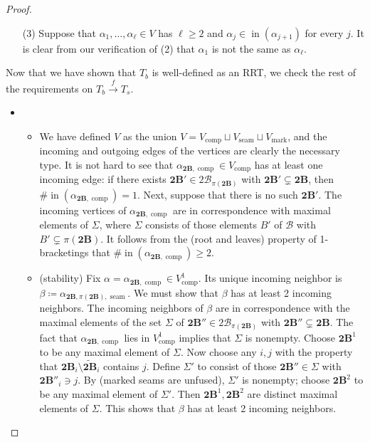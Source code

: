 \documentclass[11pt]{amsart}
\theoremstyle{definition}
\theoremstyle{remark}
\theoremstyle{plain}
\newcommand{\btB}{{\mathbf{2B}}}
\newcommand{\sB}{\mathscr{B}}
\newcommand{\stB}{2\mathscr{B}}
\newcommand{\on}{\operatorname}
\newcommand{\comp}{C^2}
\renewcommand{\comp}{{\on{comp}}}
\newcommand{\seam}{{\on{seam}}}
\newcommand{\mk}{{\on{mark}}}
\newcommand{\incom}{\on{in}}
\newcommand{\sr}{\stackrel}
\newcommand{\wt}{\widetilde}
\begin{document}
\begin{proof}
\begin{itemize}
\item[(3)] Suppose that $\alpha_1, \ldots, \alpha_\ell \in V$ has $\ell \geq 2$ and $\alpha_j \in \incom(\alpha_{j+1})$ for every $j$.
It is clear from our verification of (2) that $\alpha_1$ is not the same as $\alpha_\ell$.
\end{itemize}
Now that we have shown that $T_b$ is well-defined as an RRT, we check the rest of the requirements on $T_b \sr{f}{\to} T_s$.
\begin{itemize}
\item
\begin{itemize}
\item We have defined $V$ as the union $V = V_\comp \sqcup V_\seam \sqcup V_\mk$, and the incoming and outgoing edges of the vertices are clearly the necessary type.
It is not hard to see that $\alpha_{\btB,\comp} \in V_\comp$ has at least one incoming edge: if there exists $\btB' \in \stB_{\pi(\btB)}$ with $\btB' \subsetneq \btB$, then $\#\!\incom(\alpha_{\btB,\comp}) = 1$.
Next, suppose that there is no such $\btB'$.
The incoming vertices of $\alpha_{\btB,\comp}$ are in correspondence with maximal elements of $\Sigma$, where $\Sigma$ consists of those elements $B'$ of $\sB$ with $B' \subsetneq \pi(\btB)$.
It follows from the {\sc (root and leaves)} property of 1-bracketings that $\#\!\incom(\alpha_{\btB,\comp}) \geq 2$.

\item {\sc(stability)} Fix $\alpha = \alpha_{\btB,\comp} \in V_\comp^1$.
Its unique incoming neighbor is $\beta\coloneqq \alpha_{\btB,\pi(\btB),\seam}$.
We must show that $\beta$ has at least 2 incoming neighbors.
The incoming neighbors of $\beta$ are in correspondence with the maximal elements of the set $\Sigma$ of $\btB'' \in \stB_{\pi(\btB)}$ with $\btB'' \subsetneq \btB$.
The fact that $\alpha_{\btB,\comp}$ lies in $V_\comp^1$ implies that $\Sigma$ is nonempty.
Choose $\btB^1$ to be any maximal element of $\Sigma$.
Now choose any $i, j$ with the property that $\btB_i \setminus \wt\btB_i$ contains $j$.
Define $\Sigma'$ to consist of those $\btB'' \in \Sigma$ with $\btB''_i \ni j$.
By {\sc(marked seams are unfused)}, $\Sigma'$ is nonempty; choose $\btB^2$ to be any maximal element of $\Sigma'$.
Then $\btB^1, \btB^2$ are distinct maximal elements of $\Sigma$.
This shows that $\beta$ has at least 2 incoming neighbors.


\end{itemize}
\end{itemize}
\end{proof}
\end{document}
